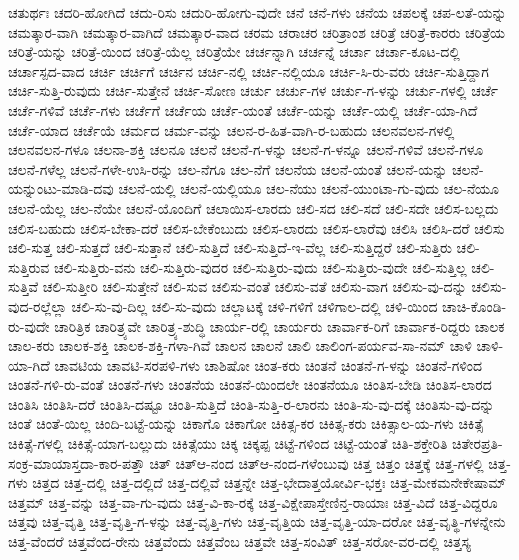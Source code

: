 {ಚತುರ್ಥಃ
ಚದರಿ-ಹೋಗಿದೆ
ಚದು-ರಿಸು
ಚದುರಿ-ಹೋಗು-ವುದೇ
ಚನೆ
ಚನೆ-ಗಳು
ಚನೆಯ
ಚಪಲಕ್ಕೆ
ಚಪ-ಲತೆ-ಯನ್ನು
ಚಮತ್ಕಾರ-ವಾಗಿ
ಚಮತ್ಕಾರ-ವಾಗಿದೆ
ಚಮತ್ಕಾರ-ವಾದ
ಚರಮ
ಚರಾಚರ
ಚರಿತ್ರಾಂಶ
ಚರಿತ್ರೆ
ಚರಿತ್ರೆ-ಕಾರರು
ಚರಿತ್ರೆಯ
ಚರಿತ್ರೆ-ಯನ್ನು
ಚರಿತ್ರೆ-ಯಿಂದ
ಚರಿತ್ರೆ-ಯೆಲ್ಲ
ಚರಿತ್ರೆಯೇ
ಚರ್ಚನ್ನಾಗಿ
ಚರ್ಚನ್ನೆ
ಚರ್ಚಾ
ಚರ್ಚಾ-ಕೂಟ-ದಲ್ಲಿ
ಚರ್ಚಾಸ್ಪದ-ವಾದ
ಚರ್ಚಿ
ಚರ್ಚಿಗೆ
ಚರ್ಚಿನ
ಚರ್ಚಿ-ನಲ್ಲಿ
ಚರ್ಚಿ-ನಲ್ಲಿಯೂ
ಚರ್ಚಿ-ಸಿ-ರು-ವರು
ಚರ್ಚಿ-ಸುತ್ತಿದ್ದಾಗ
ಚರ್ಚಿ-ಸುತ್ತಿ-ರುವುದು
ಚರ್ಚಿ-ಸುತ್ತೇನೆ
ಚರ್ಚಿ-ಸೋಣ
ಚರ್ಚು
ಚರ್ಚು-ಗಳ
ಚರ್ಚು-ಗ-ಳನ್ನು
ಚರ್ಚು-ಗಳಲ್ಲಿ
ಚರ್ಚೆ
ಚರ್ಚೆ-ಗಳಿವೆ
ಚರ್ಚೆ-ಗಳು
ಚರ್ಚೆಗೆ
ಚರ್ಚೆಯ
ಚರ್ಚೆ-ಯಂತೆ
ಚರ್ಚೆ-ಯನ್ನು
ಚರ್ಚೆ-ಯಲ್ಲಿ
ಚರ್ಚೆ-ಯಾ-ಗಿದೆ
ಚರ್ಚೆ-ಯಾದ
ಚರ್ಚೆಯೆ
ಚರ್ಮದ
ಚರ್ಮ-ವನ್ನು
ಚಲನ-ರ-ಹಿತ-ವಾಗಿ-ರ-ಬಹುದು
ಚಲನವಲನ-ಗಳಲ್ಲಿ
ಚಲನವಲನ-ಗಳೂ
ಚಲನಾ-ಶಕ್ತಿ
ಚಲನೂ
ಚಲನೆ
ಚಲನೆ-ಗ-ಳನ್ನು
ಚಲನೆ-ಗ-ಳನ್ನೂ
ಚಲನೆ-ಗಳಿವೆ
ಚಲನೆ-ಗಳೂ
ಚಲನೆ-ಗಳೆಲ್ಲ
ಚಲನೆ-ಗಳೇ-ಉಸಿ-ರನ್ನು
ಚಲ-ನೆಗೂ
ಚಲ-ನೆಗೆ
ಚಲನೆಯ
ಚಲನೆ-ಯಂತೆ
ಚಲನೆ-ಯನ್ನು
ಚಲನೆ-ಯನ್ನುಂಟು-ಮಾಡಿ-ದವು
ಚಲನೆ-ಯಲ್ಲಿ
ಚಲನೆ-ಯಲ್ಲಿಯೂ
ಚಲ-ನೆಯು
ಚಲನೆ-ಯುಂಟಾ-ಗು-ವುದು
ಚಲ-ನೆಯೂ
ಚಲನೆ-ಯೆಲ್ಲ
ಚಲ-ನೆಯೇ
ಚಲನೆ-ಯೊಂದಿಗೆ
ಚಲಾಯಿಸ-ಲಾರದು
ಚಲಿ-ಸದ
ಚಲಿ-ಸದೆ
ಚಲಿ-ಸದೇ
ಚಲಿಸ-ಬಲ್ಲದು
ಚಲಿಸ-ಬಹುದು
ಚಲಿಸ-ಬೇಕಾ-ದರೆ
ಚಲಿಸ-ಬೇಕೆಂಬುದು
ಚಲಿಸ-ಲಾರದು
ಚಲಿಸ-ಲಾರೆವು
ಚಲಿಸಿ
ಚಲಿಸಿ-ದರೆ
ಚಲಿಸು
ಚಲಿ-ಸುತ್ತ
ಚಲಿ-ಸುತ್ತದೆ
ಚಲಿ-ಸುತ್ತಾನೆ
ಚಲಿ-ಸುತ್ತಿದೆ
ಚಲಿ-ಸುತ್ತಿದೆ-ಇ-ವೆಲ್ಲ
ಚಲಿ-ಸುತ್ತಿದ್ದರೆ
ಚಲಿ-ಸುತ್ತಿರು
ಚಲಿ-ಸುತ್ತಿರುವ
ಚಲಿ-ಸುತ್ತಿರು-ವನು
ಚಲಿ-ಸುತ್ತಿರು-ವುದರ
ಚಲಿ-ಸುತ್ತಿರು-ವುದು
ಚಲಿ-ಸುತ್ತಿರು-ವುದೇ
ಚಲಿ-ಸುತ್ತಿಲ್ಲ
ಚಲಿ-ಸುತ್ತಿವೆ
ಚಲಿ-ಸುತ್ತೀರಿ
ಚಲಿ-ಸುತ್ತೇನೆ
ಚಲಿ-ಸುವ
ಚಲಿಸು-ವಂತೆ
ಚಲಿಸು-ವತೆ
ಚಲಿಸು-ವಾಗ
ಚಲಿಸು-ವು-ದನ್ನು
ಚಲಿಸು-ವುದ-ರಲ್ಲೆಲ್ಲಾ
ಚಲಿ-ಸು-ವು-ದಿಲ್ಲ
ಚಲಿ-ಸು-ವುದು
ಚಲ್ಲಾಟಕ್ಕೆ
ಚಳಿ-ಗಳಿಗೆ
ಚಳಿಗಾಲ-ದಲ್ಲಿ
ಚಳಿ-ಯಿಂದ
ಚಾಚಿ-ಕೊಂಡಿ-ರು-ವುದೇ
ಚಾರಿತ್ರಿಕ
ಚಾರಿತ್ರ್ಯವೇ
ಚಾರಿತ್ರ್ಯ-ಶುದ್ಧಿ
ಚಾರ್ಯ-ರಲ್ಲಿ
ಚಾರ್ಯರು
ಚಾರ್ವಾಕ-ರಿಗೆ
ಚಾರ್ವಾಕ-ರಿದ್ದರು
ಚಾಲಕ
ಚಾಲ-ಕರು
ಚಾಲಕ-ಶಕ್ತಿ
ಚಾಲಕ-ಶಕ್ತಿ-ಗಳಾ-ಗಿವೆ
ಚಾಲನ
ಚಾಲನೆ
ಚಾಲಿ
ಚಾಲಿಂಗ-ಪರ್ಯವ-ಸಾ-ನಮ್
ಚಾಳಿ
ಚಾಳಿ-ಯಾ-ಗಿದೆ
ಚಾವಟಿಯ
ಚಾವಟಿ-ಸರಪಳಿ-ಗಳು
ಚಾಶಿಷೋ
ಚಿಂತ-ಕರು
ಚಿಂತನೆ
ಚಿಂತನೆ-ಗ-ಳನ್ನು
ಚಿಂತನೆ-ಗಳಿಂದ
ಚಿಂತನೆ-ಗಳಿ-ರು-ವಂತೆ
ಚಿಂತನೆ-ಗಳು
ಚಿಂತನೆಯ
ಚಿಂತನೆ-ಯಿಂದಲೇ
ಚಿಂತನೆಯೂ
ಚಿಂತಿಸ-ಬೇಡಿ
ಚಿಂತಿಸ-ಲಾರದ
ಚಿಂತಿಸಿ
ಚಿಂತಿಸಿ-ದರೆ
ಚಿಂತಿಸಿ-ದಷ್ಟೂ
ಚಿಂತಿ-ಸುತ್ತಿದೆ
ಚಿಂತಿ-ಸುತ್ತಿ-ರ-ಲಾರನು
ಚಿಂತಿ-ಸು-ವು-ದಕ್ಕೆ
ಚಿಂತಿಸು-ವು-ದನ್ನು
ಚಿಂತೆ
ಚಿಂತೆ-ಯಿಲ್ಲ
ಚಿಂದಿ-ಬಟ್ಟೆ-ಯನ್ನು
ಚಿಕಾಗೊ
ಚಿಕಾಗೋ
ಚಿಕಿತ್ಸ-ಕರ
ಚಿಕಿತ್ಸ-ಕರು
ಚಿಕಿತ್ಸಾಲ-ಯ-ಗಳು
ಚಿಕಿತ್ಸೆ
ಚಿಕಿತ್ಸೆ-ಗಳಲ್ಲಿ
ಚಿಕಿತ್ಸೆ-ಯಾಗ-ಬಲ್ಲುದು
ಚಿಕಿತ್ಸೆಯು
ಚಿಕ್ಕ
ಚಿಕ್ಕಪ್ಪ
ಚಿಟ್ಟೆ-ಗಳಿಂದ
ಚಿಟ್ಟೆ-ಯಂತೆ
ಚಿತಿ-ಶಕ್ತೇರಿತಿ
ಚಿತೇರಪ್ರತಿ-ಸಂಕ್ರ-ಮಾಯಾಸ್ತದಾ-ಕಾರ-ಪತ್ತೌ
ಚಿತ್
ಚಿತ್ಆ-ನಂದ
ಚಿತ್ಆ-ನಂದ-ಗಳೆಂಬುವು
ಚಿತ್ತ
ಚಿತ್ತಂ
ಚಿತ್ತಕ್ಕೆ
ಚಿತ್ತ-ಗಳಲ್ಲಿ
ಚಿತ್ತ-ಗಳು
ಚಿತ್ತದ
ಚಿತ್ತ-ದಲ್ಲಿ
ಚಿತ್ತ-ದಲ್ಲಿದೆ
ಚಿತ್ತ-ದಲ್ಲಿವೆ
ಚಿತ್ತನ್ನೇ
ಚಿತ್ತ-ಭೇದಾತ್ತಯೋರ್ವಿ-ಭಕ್ತಃ
ಚಿತ್ತ-ಮೇಕಮನೇಕೇಷಾಮ್
ಚಿತ್ತಮ್
ಚಿತ್ತ-ವನ್ನು
ಚಿತ್ತ-ವಾ-ಗು-ವುದು
ಚಿತ್ತ-ವಿ-ಕಾ-ರಕ್ಕೆ
ಚಿತ್ತ-ವಿಕ್ಷೇಪಾಸ್ತೇಣಿನ್ತ-ರಾಯಾಃ
ಚಿತ್ತ-ವಿದೆ
ಚಿತ್ತ-ವಿದ್ದರೂ
ಚಿತ್ತವು
ಚಿತ್ತ-ವೃತ್ತಿ
ಚಿತ್ತ-ವೃತ್ತಿ-ಗ-ಳನ್ನು
ಚಿತ್ತ-ವೃತ್ತಿ-ಗಳು
ಚಿತ್ತ-ವೃತ್ತಿಯ
ಚಿತ್ತ-ವೃತ್ತಿ-ಯಾ-ದರೋ
ಚಿತ್ತ-ವೃತ್ಥಿ-ಗಳನ್ನೇನು
ಚಿತ್ತ-ವೆಂದರೆ
ಚಿತ್ತವೆಂದ-ರೇನು
ಚಿತ್ತವೆಂದು
ಚಿತ್ತವೆಂಬ
ಚಿತ್ತವೇ
ಚಿತ್ತ-ಸಂವಿತ್
ಚಿತ್ತ-ಸರೋ-ವರ-ದಲ್ಲಿ
ಚಿತ್ತಸ್ಯ
}
